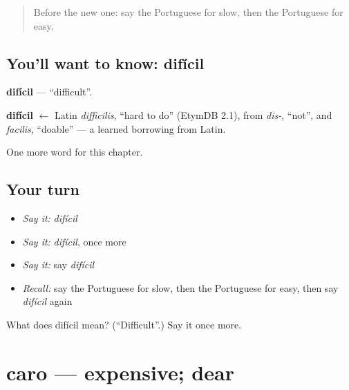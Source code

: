 \label{lesson:PT-C66-dificil}



\begin{quote}
Before the new one: say the Portuguese for slow, then the Portuguese for easy.
\end{quote}

\subsection*{You'll want to know: difícil}
\textbf{difícil} — \textquotedblleft{}difficult\textquotedblright{}.

\begin{cousinweb}
\textbf{difícil} $\leftarrow$ Latin \emph{difficilis}, \textquotedblleft{}hard to do\textquotedblright{} (EtymDB 2.1), from \emph{dis-}, \textquotedblleft{}not\textquotedblright{}, and \emph{facilis}, \textquotedblleft{}doable\textquotedblright{} — a learned borrowing from Latin.
\end{cousinweb}

\begin{grammarlens}[title={What you've built}]
One more word for this chapter.
\end{grammarlens}

\subsection*{Your turn}
\begin{itemize}
\raggedright
  \item \emph{Say it:} \emph{difícil}
  \item \emph{Say it:} \emph{difícil}, once more
  \item \emph{Say it:} say \emph{difícil}
  \item \emph{Recall:} say the Portuguese for slow, then the Portuguese for easy, then say \emph{difícil} again
\end{itemize}

\begin{tcolorbox}[breakable,colback=teal!4,colframe=teal!35!black,title={Before you move on}]
What does difícil mean? (\textquotedblleft{}Difficult\textquotedblright{}.) Say it once more.
\end{tcolorbox}
\section[caro]{caro — expensive; dear}

\label{lesson:PT-C66-caro}



